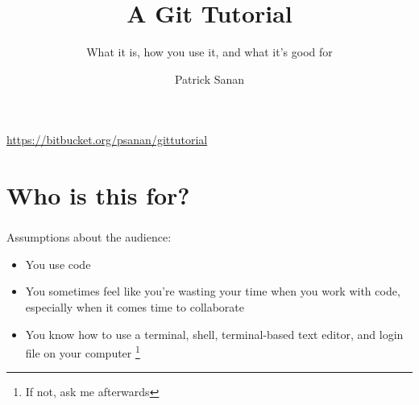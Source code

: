\documentclass{beamer}
\author{Patrick Sanan}
\institute[USI/ETHZ] 
{
USI Lugano ICS / ETH Z\"{u}rich ERDW\\
}
\title{A Git Tutorial}
\subtitle[]{What it is, how you use it, and what it's good for}
\date[]{}
\begin{document}

\begin{frame}[fragile]
\titlepage 
\begin{center}
\href{https://bitbucket.org/psanan/gittutorial}{https://bitbucket.org/psanan/gittutorial}
\end{center}
\end{frame}


\begin{frame}
\tableofcontents 
\end{frame}

\section{Who is this for?}
\begin{frame}[fragile]
\frametitle{}
Assumptions about the audience:
\begin{itemize}
\item You use code
\item You sometimes feel like you're wasting your time when you work with code, especially when it comes time to collaborate
\item You know how to use a terminal, shell, terminal-based text editor, and login file on your computer \footnote{If not, ask me afterwards}
\end{itemize}
\end{frame}


\end{document}
